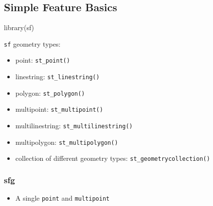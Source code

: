 \documentclass[
]{book}
\newenvironment{Shaded}{\begin{snugshade}}{\end{snugshade}}
\newcommand{\FunctionTok}[1]{\textcolor[rgb]{0.00,0.00,0.00}{#1}}
\newcommand{\NormalTok}[1]{#1}
\providecommand{\tightlist}{%
  \setlength{\itemsep}{0pt}\setlength{\parskip}{0pt}}
\begin{document}
\hypertarget{simple-feature-basics}{%
\subsection{Simple Feature Basics}\label{simple-feature-basics}}

\begin{Shaded}
\begin{Highlighting}[]
\FunctionTok{library}\NormalTok{(sf)}
\end{Highlighting}
\end{Shaded}

\texttt{sf} geometry types:

\begin{itemize}
\tightlist
\item
  point: \texttt{st\_point()}
\item
  linestring: \texttt{st\_linestring()}
\item
  polygon: \texttt{st\_polygon()}
\item
  multipoint: \texttt{st\_multipoint()}
\item
  multilinestring: \texttt{st\_multilinestring()}
\item
  multipolygon: \texttt{st\_multipolygon()}
\item
  collection of different geometry types: \texttt{st\_geometrycollection()}
\end{itemize}

\hypertarget{sfg}{%
\subsubsection{sfg}\label{sfg}}

\begin{itemize}
\tightlist
\item
  A single \texttt{point} and \texttt{multipoint}
\end{itemize}
\end{document}
